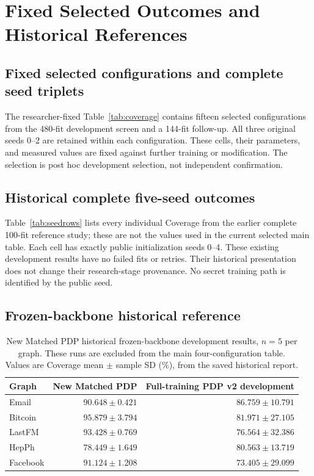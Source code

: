 \chapter{Fixed Selected Outcomes and Historical References}\label{app:development}
\section{Fixed selected configurations and complete seed triplets}
The researcher-fixed Table~\ref{tab:coverage} contains fifteen selected configurations from the 480-fit development screen and a 144-fit follow-up. All three original seeds 0--2 are retained within each configuration. These cells, their parameters, and measured values are fixed against further training or modification. The selection is post hoc development selection, not independent confirmation.



\clearpage
\section{Historical complete five-seed outcomes}
Table~\ref{tab:seedrows} lists every individual Coverage from the earlier complete 100-fit reference study; these are not the values used in the current selected main table. Each cell has exactly public initialization seeds 0--4. These existing development results have no failed fits or retries. Their historical presentation does not change their research-stage provenance. No secret training path is identified by the public seed.


\clearpage
\section{Frozen-backbone historical reference}
\begin{table}[htbp]
\centering\small
\caption{New Matched PDP historical frozen-backbone development results, $n=5$ per graph. These runs are excluded from the main four-configuration table. Values are Coverage mean $\pm$ sample SD (\%), from the saved historical report.}\label{tab:newmatched}
\begin{tabular}{lrr}\toprule
Graph & New Matched PDP & Full-training PDP v2 development\\\midrule
Email & $90.648\pm0.421$ & $86.759\pm10.791$\\
Bitcoin & $95.879\pm3.794$ & $81.971\pm27.105$\\
LastFM & $93.428\pm0.769$ & $76.564\pm32.386$\\
HepPh & $78.449\pm1.649$ & $80.563\pm13.719$\\
Facebook & $91.124\pm1.208$ & $73.405\pm29.099$\\\bottomrule
\end{tabular}
\end{table}

